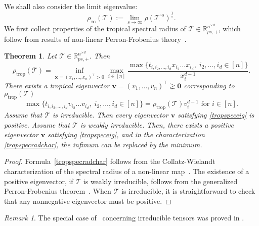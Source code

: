 \documentclass{amsart}
\newcommand{\R}{\mathbb{R}}
\newcommand{\bv}{\mathbf{v}}
\newcommand{\x}{\mathbf{x}}
\newcommand{\0}{\mathbf{0}}
\newcommand{\1}{\mathbf{1}}
\newcommand{\cT}{\mathcal{T}}
\newcommand{\trans}{^\top}
\newcommand{\trop}{\mathrm{trop}}
\newtheorem{theorem}[theo]{Theorem}
\theoremstyle{remark}
\newtheorem{rem}{Remark}
\numberwithin{equation}{section} %
\begin{document}
We shall also consider the limit eigenvalue:
 \begin{equation}\label{tropspecrad}
 \rho_{\infty}(\cT):=\lim_{s\to\infty} \rho(\cT^{\circ s})^{\frac{1}{s}}.
 \end{equation}
 We first collect properties of the tropical spectral radius of $\cT\in\R_{ps,+}^{n^{\times d}}$, which follow from results of non-linear Perron-Frobenius theory~\cite{nuss86,GG04}.
 \begin{theorem}\label{tropspecradthm0}  Let $\cT\in \R_{ps,+}^{n^{\times d}}$.  Then
 \begin{equation}\label {tropspecradchar}
 \rho_{\trop}(\cT)=\inf_{\x=(x_1,\ldots,x_n)\trans>0} \max_{i\in[n]} \frac{\max\{t_{i,i_2,\ldots,i_d}x_{i_2}\ldots x_{i_d},\;i_2,\ldots,i_d\in[n]\}}{x_i^{d-1}}.
 \end{equation}
 There exists a tropical eigenvector $\bv=(v_1,\ldots,v_n) \trans \gneq \0$ corresponding to $\rho_{\trop}(\cT)$
 \begin{equation}\label{tropspeceig}
 \max\{t_{i,i_2,\ldots,i_d}v_{i_2}\ldots v_{i_d},\;i_2,\ldots,i_d\in[n]\}=\rho_{\trop}(\cT)v_i^{d-1} \textrm{ for } i\in [n].
 \end{equation}
 Assume that $\cT$ is irreducible.  Then every eigenvector $\bv$ satisfying \eqref{tropspeceig} is positive. 
%
Assume that $\cT$ is weakly irreducible. Then, there 
exists a positive eigenvector $\bv$ satisfying \eqref{tropspeceig},
and in the characterization
 \eqref{tropspecradchar}, the infimum can be replaced by the minimum.
 \end{theorem}
\begin{proof}
Formula~\eqref{tropspecradchar} follows from the Collatz-Wielandt characterization of the spectral radius of a non-linear map~\cite{nuss86}. The existence
of a positive eigenvector, if $\cT$ is weakly irreducible, follows
from the generalized Perron-Frobenius theorem~\cite[Theorem 2]{GG04}. 
When $\cT$ is irreducible, it is straightforward to check that any
nonnegative eigenvector must be positive.
\end{proof}
\begin{rem}
  The special case of~ concerning irreducible
  tensors was proved in \cite[Th~3.3]{BUSH201964}.
  \end{rem}
\end{document}
